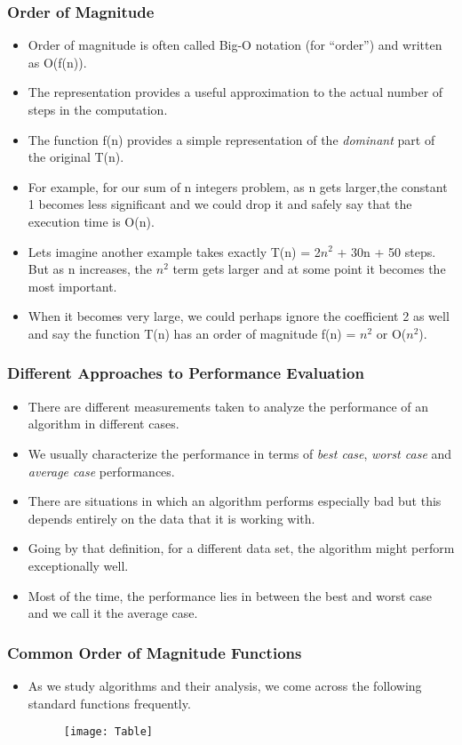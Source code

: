 \documentclass{beamer}
\begin{document}
\begin{frame}
\frametitle{Order of Magnitude}
\begin{itemize}
\item Order of magnitude is often called Big-O notation (for “order”) and written as
O(f(n)).
\item The representation provides a useful approximation to the actual number of steps in the computation.
\item The function f(n) provides a simple representation of the \textit{dominant} part of the original T(n).
\item For example, for our sum of n integers problem, as n gets larger,the constant 1 becomes less significant and we could drop it and safely say that the execution time is O(n).
\item Lets imagine another example takes exactly T(n) = 2$n^2$ + 30n + 50 steps. But as n increases, the $n^2$ term gets larger and at some point it becomes the most important.
\item When it becomes very large, we could perhaps ignore the coefficient 2 as well and say the function T(n) has an order of magnitude f(n) = $n^2$ or O($n^2$). 
\end{itemize}
\end{frame}

\begin{frame}
\frametitle{Different Approaches to Performance Evaluation}
\begin{itemize}
\item There are different measurements taken to analyze the performance of an algorithm in different cases.
\item We usually characterize the performance in terms of \textit{best case}, \textit{worst case} and \textit{average case} performances.
\item There are situations in which an algorithm performs especially bad but this depends entirely on the data that it is working with.
\item Going by that definition, for a different data set, the algorithm might perform exceptionally well.
\item Most of the time, the performance lies in between the best and worst case and we call it the average case.
\end{itemize}
\end{frame}

\begin{frame}
\frametitle{Common Order of Magnitude Functions}
\begin{itemize}
\item As we study algorithms and their analysis, we come across the following standard functions frequently.
\begin{figure}
\texttt{[image: Table]}
\end{figure}
\end{itemize}
\end{frame}
\end{document}
